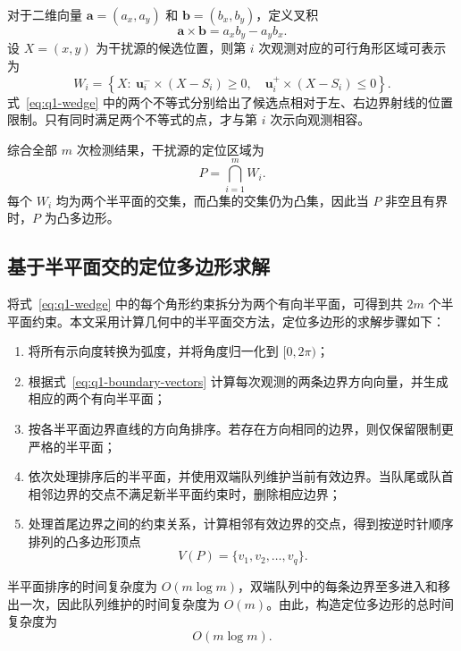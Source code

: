 对于二维向量 $\mathbf{a}=(a_x,a_y)$ 和 $\mathbf{b}=(b_x,b_y)$，定义叉积
\begin{equation}
  \mathbf{a}\times\mathbf{b}=a_xb_y-a_yb_x.
  \label{eq:q1-cross-product}
\end{equation}
设 $X=(x,y)$ 为干扰源的候选位置，则第 $i$ 次观测对应的可行角形区域可表示为
\begin{equation}
  W_i=\left\{
  X:\ \mathbf{u}_i^-\times(X-S_i)\geq 0,\quad
  \mathbf{u}_i^+\times(X-S_i)\leq 0
  \right\}.
  \label{eq:q1-wedge}
\end{equation}
式~\eqref{eq:q1-wedge} 中的两个不等式分别给出了候选点相对于左、右边界射线的位置限制。只有同时满足两个不等式的点，才与第 $i$ 次示向观测相容。

综合全部 $m$ 次检测结果，干扰源的定位区域为
\begin{equation}
  P=\bigcap_{i=1}^{m}W_i.
  \label{eq:q1-polygon}
\end{equation}
每个 $W_i$ 均为两个半平面的交集，而凸集的交集仍为凸集，因此当 $P$ 非空且有界时，$P$ 为凸多边形。

\subsection{基于半平面交的定位多边形求解}

将式~\eqref{eq:q1-wedge} 中的每个角形约束拆分为两个有向半平面，可得到共 $2m$ 个半平面约束。本文采用计算几何中的半平面交方法\cite{deberg2008}，定位多边形的求解步骤如下：

\begin{enumerate}
  \item 将所有示向度转换为弧度，并将角度归一化到 $[0,2\pi)$；
  \item 根据式~\eqref{eq:q1-boundary-vectors} 计算每次观测的两条边界方向向量，并生成相应的两个有向半平面；
  \item 按各半平面边界直线的方向角排序。若存在方向相同的边界，则仅保留限制更严格的半平面；
  \item 依次处理排序后的半平面，并使用双端队列维护当前有效边界。当队尾或队首相邻边界的交点不满足新半平面约束时，删除相应边界；
  \item 处理首尾边界之间的约束关系，计算相邻有效边界的交点，得到按逆时针顺序排列的凸多边形顶点
  \begin{equation}
    V(P)=\{v_1,v_2,\ldots,v_q\}.
    \label{eq:q1-vertices}
  \end{equation}
\end{enumerate}

半平面排序的时间复杂度为 $O(m\log m)$，双端队列中的每条边界至多进入和移出一次，因此队列维护的时间复杂度为 $O(m)$。由此，构造定位多边形的总时间复杂度为
\begin{equation}
  O(m\log m).
  \label{eq:q1-hpi-complexity}
\end{equation}

